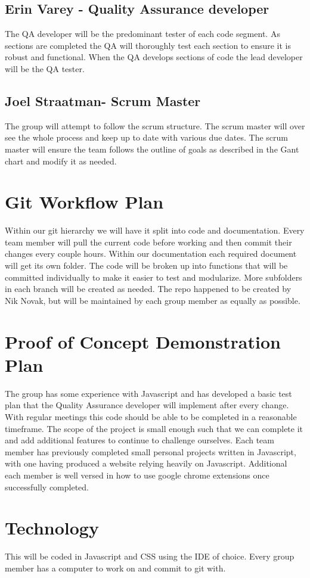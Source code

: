 \documentclass{article}
\begin{document}
\subsection{Erin Varey - Quality Assurance developer}
The QA developer will be the predominant tester of each code segment. As sections are completed the QA will thoroughly test each section to ensure it is robust and functional. When the QA develops sections of code the lead developer will be the QA tester. 
\subsection{Joel Straatman- Scrum Master}
The group will attempt to follow the scrum structure. The scrum master will over see the whole process and keep up to date with various due dates. The scrum master will ensure the team follows the outline of goals as described in the Gant chart and modify it as needed. 
\section{Git Workflow Plan}
Within our git hierarchy we will have it split into code and documentation. Every team member will pull the current code before working and then commit their changes every couple hours. Within our documentation each required document will get its own folder. The code will be broken up into functions that will be committed individually to make it easier to test and modularize. More subfolders in each branch will be created as needed. The repo happened to be created by Nik Novak, but will be maintained by each group member as equally as possible.
\section{Proof of Concept Demonstration Plan}
The group has some experience with Javascript and has developed a basic test plan that the Quality Assurance developer will implement after every change. With regular meetings this code should be able to be completed in a reasonable timeframe. The scope of the project is small enough such that we can complete it and add additional features to continue to challenge ourselves. Each team member has previously completed small personal projects written in Javascript, with one having produced a website relying heavily on Javascript. Additional each member is well versed in how to use google chrome extensions once successfully completed. 
\section{Technology}
This will be coded in Javascript and CSS using the IDE of choice. Every group member has a computer to work on and commit to git with.
\end{document}
